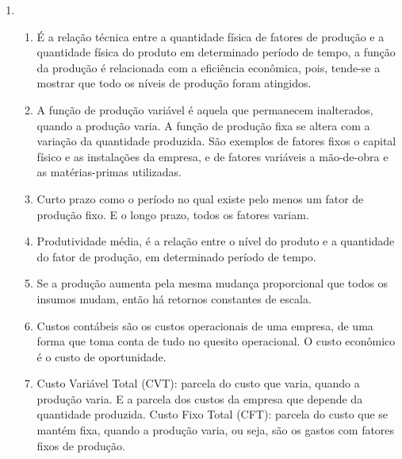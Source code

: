 \documentclass[a4paper, 12pt]{article}
\begin{document}
\begin{enumerate}
	\\ \item
	\begin{enumerate}
		\item É a relação técnica entre a quantidade física de fatores de produção e a quantidade física do produto em determinado período de tempo, a função da produção é relacionada com a eficiência econômica, pois, tende-se a mostrar que todo os níveis de produção foram atingidos.\\
		
		\item A função de produção variável é aquela que permanecem inalterados, quando a produção varia. A função de produção fixa se altera com a variação da quantidade produzida. São exemplos de fatores fixos o capital físico e as instalações da empresa, e de fatores variáveis a mão-de-obra e as matérias-primas utilizadas.\\
		
		\item Curto prazo como o período no qual existe pelo menos um fator de produção fixo. E o longo prazo, todos os fatores variam.\\
		
		\item Produtividade média, é a relação entre o nível do produto e a quantidade do fator de produção, em determinado período de tempo.\\
		
		\item Se a produção aumenta pela mesma mudança proporcional que todos os insumos mudam, então há retornos constantes de escala.\\
		
		\item Custos contábeis são os custos operacionais de uma empresa, de uma forma que toma conta de tudo no quesito operacional. O custo econômico é o custo de oportunidade.\\
		
		\item Custo Variável Total (CVT): parcela do custo que varia, quando a produção varia. E a parcela dos custos da empresa que depende da quantidade produzida. Custo Fixo Total (CFT): parcela do custo que se mantém fixa, quando a produção varia, ou seja, são os gastos com fatores fixos de produção.\\


\end{enumerate}
\end{enumerate}
\end{document}
